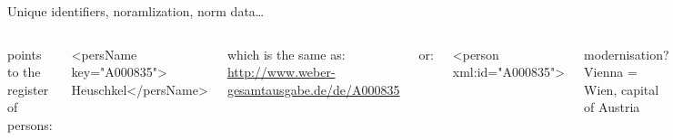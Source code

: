 \begin{frame}[fragile]{Unique identifiers, noramlization, norm data\dots}

  \begin{columns}[T,onlytextwidth]
       points to the register of persons:
\begin{xmlcode}
<persName key="A000835">
  Heuschkel</persName>
\end{xmlcode}

which is the same as: \\
\protect\url{http://www.weber-gesamtausgabe.de/de/A000835}

or:
\begin{xmlcode}
<person xml:id="A000835">
\end{xmlcode}



      \begin{block}{modernisation?}\footnotesize
        Vienna = Wien, capital of Austria
      \end{block}

      \begin{alertblock}{main entry point?}\footnotesize
        Preßburg $\to$ Bratislava, capitol of Slovakia \\
also: Preßburg, Pozsony, Prešporok
      \end{alertblock}

      \begin{exampleblock}{identifier?}\scriptsize
        Bernardus Papiensis $\to$ VIAF-ID: 15126540 $\to$\protect\url{<http://viaf.org/viaf/15126540/>}

\textbf{main entry point:} Bernhard von Pavia, before 1150-18.9.1213
also: Bernardus Papiensis, Bernardo Balbi, Bernardus Balbus, Bernard of Pavie, Bernardus Circa, Bernardus praepositus Faventinus, Bischof Bernhard von Faenza, Bischof Bernhard von Pavia \dots
      \end{exampleblock}

  \end{columns}
\end{frame}



